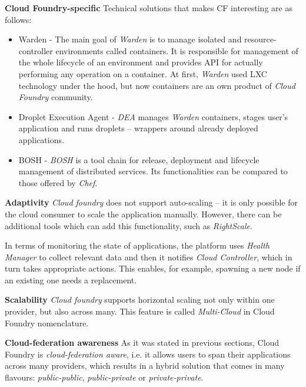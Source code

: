 \begin{asparaenum}

\item[\textbf{Cloud Foundry-specific}] Technical solutions that makes CF interesting are as follows:
\begin{itemize}
\item Warden - The main goal of \emph{Warden} is to manage isolated and resource-controller environments called containers. It is responsible for management of the whole lifecycle of an environment and provides API for actually performing any operation on a container. At first, \emph{Warden} used LXC technology under the hood, but now containers are an own product of \emph{Cloud Foundry} community.
\item Droplet Execution Agent - \emph{DEA} manages \emph{Warden} containers, stages user's application and runs droplets -- wrappers around already deployed applications.
\item BOSH - \emph{BOSH} is a tool chain for release, deployment and lifecycle management of distributed services. Its functionalities can be compared to those offered by \emph{Chef}.
\end{itemize}

\item[\textbf{Adaptivity}]
\emph{Cloud foundry} does not support auto-scaling -- it is only possible for the cloud consumer to scale the application manually. However, there can be additional tools which can add this functionality, such as \emph{RightScale}.

In terms of monitoring the state of applications, the platform uses \emph{Health Manager} to collect relevant data and then it notifies \emph{Cloud Controller}, which in turn takes appropriate actions. This enables, for example, spawning a new node if an existing one needs a replacement.

\item[\textbf{Scalability}]
\emph{Cloud foundry} supports horizontal scaling not only within one provider, but also across many. This feature is called \emph{Multi-Cloud} in Cloud Foundry nomenclature.

\item[\textbf{Cloud-federation awareness}]
As it was stated in previous sections, Cloud Foundry is \emph{cloud-federation aware}, i.e. it allows users to span their applications across many providers, which results in a hybrid solution that comes in many flavours: \emph{public-public}, \emph{public-private} or \emph{private-private}.
\end{asparaenum}

